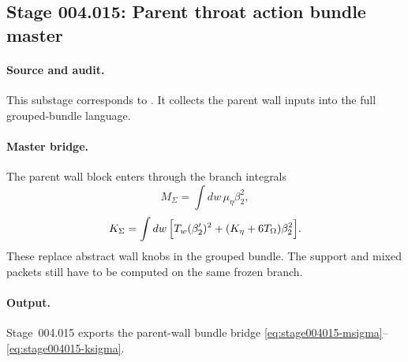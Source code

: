 \subsection*{Stage 004.015: Parent throat action bundle master}
\label{subsec:stage004015-parent-throat-action-bundle-master}

\paragraph{Source and audit.}
This substage corresponds to
.
It collects the parent wall inputs into the full grouped-bundle language.

\paragraph{Master bridge.}
The parent wall block enters through the branch integrals
\begin{equation}
\label{eq:stage004015-msigma}
M_\Sigma=\int dw\,\mu_\eta\beta_2^2,
\end{equation}
\begin{equation}
\label{eq:stage004015-ksigma}
K_\Sigma=\int dw\,\Bigl[T_w(\beta_2')^2+
(K_\eta+6T_\Omega)\beta_2^2\Bigr].
\end{equation}
These replace abstract wall knobs in the grouped bundle.  The support and
mixed packets still have to be computed on the same frozen branch.

\paragraph{Output.}
Stage~004.015 exports the parent-wall bundle bridge
\eqref{eq:stage004015-msigma}--\eqref{eq:stage004015-ksigma}.
